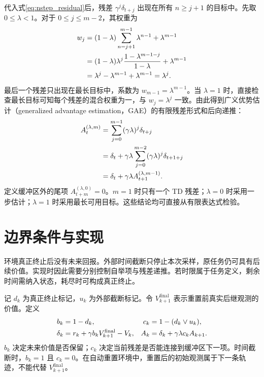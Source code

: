 代入式\eqref{eq:nstep_residual}后，残差 $\gamma^j\delta_{t+j}$ 出现在所有 $n\geq j+1$ 的目标中。先取 $0\leq\lambda<1$。对于 $0\leq j\leq m-2$，其权重为
\begin{align}\label{eq:coefficient}
 w_j&=(1-\lambda)\sum_{n=j+1}^{m-1}\lambda^{n-1}+\lambda^{m-1}\notag\\
 &=(1-\lambda)\lambda^j\frac{1-\lambda^{m-1-j}}{1-\lambda}+\lambda^{m-1}\notag\\
 &=\lambda^j-\lambda^{m-1}+\lambda^{m-1}=\lambda^j.
\end{align}
最后一个残差只出现在最长目标中，系数为 $w_{m-1}=\lambda^{m-1}$。当 $\lambda=1$ 时，直接检查最长目标可知每个残差的混合权重为一，与 $w_j=\lambda^j$ 一致。由此得到广义优势估计（generalized advantage estimation，GAE）的有限残差形式和后向递推：
\begin{align}\label{eq:gae_recursion}
 A_t^{(\lambda,m)}
 &=\sum_{j=0}^{m-1}(\gamma\lambda)^j\delta_{t+j}\notag\\
 &=\delta_t+\gamma\lambda\sum_{j=0}^{m-2}(\gamma\lambda)^j\delta_{t+1+j}\notag\\
 &=\delta_t+\gamma\lambda A_{t+1}^{(\lambda,m-1)}.
\end{align}
定义缓冲区外的尾项 $A_{t+m}^{(\lambda,0)}=0$。$m=1$ 时只有一个 TD 残差；$\lambda=0$ 时采用一步估计；$\lambda=1$ 时采用最长可用目标。这些结论均可直接从有限表达式检验。

\section{边界条件与实现}\label{sec:boundary}
环境真正终止后没有未来回报。外部时间截断只停止本次采样，原任务仍可具有后续价值。实现时因此需要分别控制自举项与残差递推。若时限属于任务定义，剩余时间需纳入状态，耗尽时可构成真正终止。

记 $d_k$ 为真正终止标记，$u_k$ 为外部截断标记。令 $V_{k+1}^{\mathrm{final}}$ 表示重置前真实后继观测的价值。定义
\begin{align}\label{eq:masks}
 b_k&=1-d_k, & c_k&=1-(d_k\lor u_k),\notag\\
 \delta_k&=r_k+\gamma b_kV_{k+1}^{\mathrm{final}}-V_k, &
 A_k&=\delta_k+\gamma\lambda c_k A_{k+1}.
\end{align}
$b_k$ 决定未来价值是否保留；$c_k$ 决定当前残差是否能连接到缓冲区下一项。时间截断时，$b_k=1$ 且 $c_k=0$。在自动重置环境中，重置后的初始观测属于下一条轨迹，不能代替 $V_{k+1}^{\mathrm{final}}$。

